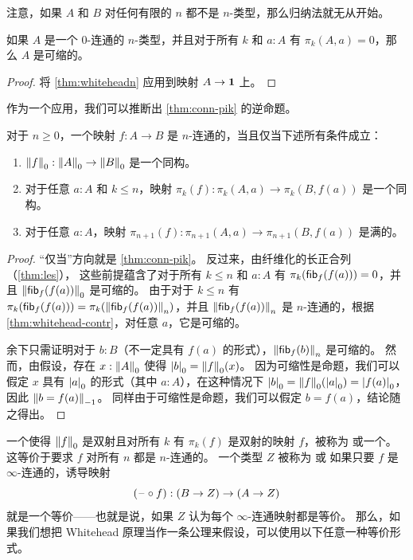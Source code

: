 注意，如果 $A$ 和 $B$ 对任何有限的 $n$ 都不是 $n$-类型，那么归纳法就无从开始。

\begin{cor}\label{thm:whitehead-contr}
  如果 $A$ 是一个 $0$-连通的 $n$-类型，并且对于所有 $k$ 和 $a:A$ 有 $\pi_k(A,a)=0$，那么 $A$ 是可缩的。
\end{cor}

\begin{proof}
  将 \cref{thm:whiteheadn} 应用到映射 $A\to\unit$ 上。
\end{proof}

作为一个应用，我们可以推断出 \cref{thm:conn-pik} 的逆命题。

\begin{cor}\label{thm:pik-conn}
  对于 $n\ge 0$，一个映射 $f:A\to B$ 是 $n$-连通的，当且仅当下述所有条件成立：
  \begin{enumerate}
  \item $\trunc0f:\trunc0A \to \trunc0B$ 是一个同构。
  \item 对于任意 $a:A$ 和 $k\le n$，映射 $\pi_k(f):\pi_k(A,a) \to \pi_k(B,f(a))$ 是一个同构。
  \item 对于任意 $a:A$，映射 $\pi_{n+1}(f):\pi_{n+1}(A,a) \to \pi_{n+1}(B,f(a))$ 是满的。
  \end{enumerate}
\end{cor}

\begin{proof}
  “仅当”方向就是 \cref{thm:conn-pik}。
  反过来，由纤维化的长正合列（\cref{thm:les}），
  这些前提蕴含了对于所有 $k\le n$ 和 $a:A$ 有 $\pi_k(\hfib f {f(a)})=0$，并且 $\trunc 0{\hfib f{f(a)}}$ 是可缩的。
  由于对于 $k\le n$ 有 $\pi_k(\hfib f {f(a)}) = \pi_k(\trunc n{\hfib f{f(a)}})$，并且 $\trunc n{\hfib f{f(a)}}$ 是 $n$-连通的，根据 \cref{thm:whitehead-contr}，对任意 $a$，它是可缩的。

  余下只需证明对于 $b:B$（不一定具有 $f(a)$ 的形式），$\trunc n{\hfib f{b}}$ 是可缩的。
  然而，由假设，存在 $x:\trunc0A$ 使得 $\tproj 0b = \trunc0f(x)$。
  因为可缩性是命题，我们可以假定 $x$ 具有 $\tproj0a$ 的形式（其中 $a:A$），在这种情况下 $\tproj 0 b = \trunc0f(\tproj0a) = \tproj0{f(a)}$，因此 $\trunc{-1}{b=f(a)}$。
  同样由于可缩性是命题，我们可以假定 $b=f(a)$，结论随之得出。
\end{proof}

一个使得 $\trunc0f$ 是双射且对所有 $k$ 有 $\pi_k(f)$ 是双射的映射 $f$，被称为 %
%
或一个。%
%
这等价于要求 $f$ 对所有 $n$ 都是 $n$-连通的。
一个类型 $Z$ 被称为 %
%
或%
%
如果只要 $f$ 是 $\infty$-连通的，诱导映射
\[(\blank\circ f):(B\to Z) \to (A\to Z)\]
就是一个等价——也就是说，如果 $Z$ 认为每个 $\infty$-连通映射都是等价。
%
那么，如果我们想把 Whitehead 原理当作一条公理来假设，可以使用以下任意一种等价形式。

